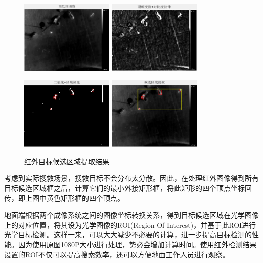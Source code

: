\begin{figure}[h]
    \centering
    \includegraphics[height=3.5cm]{figures/红外目标候选区域提取结果1.png}
    \quad
    \includegraphics[height=3.5cm]{figures/红外目标候选区域提取结果2.png}
    
    \includegraphics[height=3.5cm]{figures/红外目标候选区域提取结果3.png}
    \quad
    \includegraphics[height=3.5cm]{figures/红外目标候选区域提取结果4.png}
    \caption{红外目标候选区域提取结果}\label{BoundingBoxResult}
\end{figure}

考虑到实际搜救场景，搜救目标不会分布太分散。因此，在处理红外图像得到所有目标候选区域框之后，计算它们的最小外接矩形框，将此矩形的四个顶点坐标回传，即上图中黄色矩形框的四个顶点。

地面端根据两个成像系统之间的图像坐标转换关系，得到目标候选区域在光学图像上的对应位置，将其设为光学图像的ROI(Region Of Interest)，并基于此ROI进行光学目标检测。这样一来，可以大大减少不必要的计算，进一步提高目标检测的性能。因为使用原图1080P大小进行处理，势必会增加计算时间。使用红外检测结果设置的ROI不仅可以提高搜索效率，还可以方便地面工作人员进行观察。




